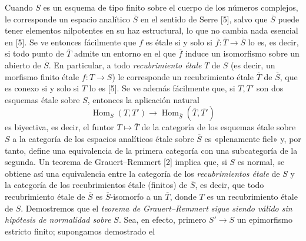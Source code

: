 \documentclass[11pt,twoside,openany]{book}
\numberwithin{equation}{section}
\theoremstyle{plain}
\theoremstyle{definition}
\theoremstyle{remark}
\theoremstyle{plain}
\theoremstyle{definition}
\theoremstyle{remark}
\begin{document}
Cuando $S$ es un esquema de tipo finito sobre el cuerpo de los números
complejos, le corresponde un espacio analítico $\overline S$ en el sentido de
Serre [5], salvo que $\overline S$ puede tener elementos nilpotentes en su haz
estructural, lo que no cambia nada esencial en [5]. Se ve entonces fácilmente
que $f$ es étale si y solo si
$\overline f:\overline T\longrightarrow\overline S$ lo es, es decir, si todo
punto de $\overline T$ admite un entorno en el que $\overline f$ induce un
isomorfismo sobre un abierto de $\overline S$. En particular, a todo
\emph{recubrimiento étale} $T$ de $S$ (es decir, un morfismo finito étale
$f:T\longrightarrow S$) le corresponde un recubrimiento étale $\overline T$ de
$\overline S$, que es conexo si y solo si $T$ lo es [5]. Se ve además
fácilmente que, si $T,T'$ son dos esquemas étale sobre $S$, entonces la
aplicación natural
\[
  \operatorname{Hom}_S(T,T')\longrightarrow
  \operatorname{Hom}_{\overline S}(\overline T,\overline{T'})
\]
es biyectiva, es decir, el funtor $T\longmapsto\overline T$ de la categoría de
los esquemas étale sobre $S$ a la categoría de los espacios analíticos étale
sobre $\overline S$ es «plenamente fiel» y, por tanto, define una equivalencia
de la primera categoría con una subcategoría de la segunda. Un teorema de
Grauert--Remmert [2] implica que, si $S$ es normal, se obtiene así una
equivalencia entre la categoría de los \emph{recubrimientos étale} de $S$ y la
categoría de los recubrimientos étale (finitos) de $\overline S$, es decir, que
todo recubrimiento étale de $\overline S$ es $\overline S$-isomorfo a un
$\overline T$, donde $T$ es un recubrimiento étale de $S$. Demostremos que el
\emph{teorema de Grauert--Remmert sigue siendo válido sin hipótesis de
normalidad sobre $S$}. Sea, en efecto, primero $S'\longrightarrow S$ un
epimorfismo estricto finito; supongamos demostrado el
\end{document}
